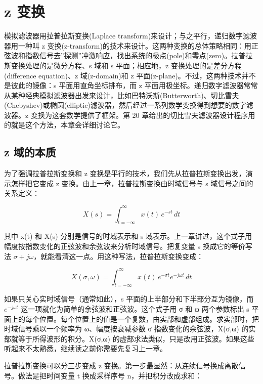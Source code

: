 
\chapter{z 变换}\label{ch-33}

模拟滤波器用拉普拉斯变换(Laplace
transform)来设计；与之平行，递归数字滤波器用一种叫 z
变换(z-transform)的技术来设计。这两种变换的总体策略相同：用正弦波和指数信号去''探测''冲激响应，找出系统的极点(pole)和零点(zero)。拉普拉斯变换处理的是微分方程、s
域和 s 平面；相应地，z 变换处理的是差分方程(difference equation)、z
域(z-domain)和 z 平面(z-plane)。不过，这两种技术并不是彼此的镜像：s
平面用直角坐标排布，而 z
平面用极坐标。递归数字滤波器常常从某种经典模拟滤波器出发来设计，比如巴特沃斯(Butterworth)、切比雪夫(Chebyshev)或椭圆(elliptic)滤波器，然后经过一系列数学变换得到想要的数字滤波器。z
变换为这套数学提供了框架。第 20
章给出的切比雪夫滤波器设计程序用的就是这个方法，本章会详细讨论它。

\section{z 域的本质}

为了强调拉普拉斯变换和 z
变换是平行的技术，我们先从拉普拉斯变换出发，演示怎样把它变成 z
变换。由上一章，拉普拉斯变换由时域信号与 s 域信号之间的关系定义：

\[X(s) = \int_{t=-\infty}^{\infty} x(t)\, e^{-st}\, dt\]

其中 x(t) 和 X(s) 分别是信号的时域表示和 s
域表示。上一章讲过，这个式子用幅度按指数变化的正弦波和余弦波来分析时域信号。把复变量
s 换成它的等价写法
\(\sigma + j\omega\)，就能看清这一点。用这种写法，拉普拉斯变换变成：

\[X(\sigma, \omega) = \int_{t=-\infty}^{\infty} x(t)\, e^{-\sigma t} e^{-j\omega t}\, dt\]

如果只关心实时域信号（通常如此），s 平面的上半部分和下半部分互为镜像，而
\(e^{-j\omega t}\) 这一项就化为简单的余弦波和正弦波。这个式子用 σ 和 ω
两个参数标出 s
平面上的每个位置。每个位置上的值是一个复数，由实部和虚部组成。求实部时，把时域信号乘以一个频率为
ω、幅度按衰减参数 σ 指数变化的余弦波，X(σ,ω)
的实部就等于所得波形的积分。X(σ,ω)
的虚部求法类似，只是改用正弦波。如果这些听起来不太熟悉，继续读之前你需要先复习上一章。

拉普拉斯变换可以分三步变成 z
变换。第一步最显然：从连续信号换成离散信号。做法是把时间变量 t
换成采样序号 n，并把积分改成求和：

